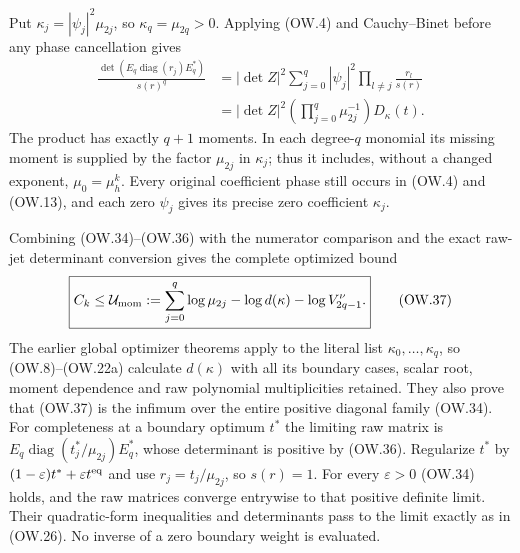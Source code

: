 \documentclass[11pt]{article}
\newcommand{\diag}{\operatorname{diag}}
\begin{document}
Put $\kappa_j=|\psi_j|^2\mu_{2j}$, so $\kappa_q=\mu_{2q}>0$.
Applying (OW.4) and Cauchy--Binet before any phase cancellation gives
\[
 \begin{split}
 \frac{\det(E_q\diag(r_j)E_q^*)}{s(r)^q}
 &=|\det Z|^2\sum_{j=0}^q|\psi_j|^2
                 \prod_{l\ne j}\frac{r_l}{s(r)}\\
 &=|\det Z|^2\left(\prod_{j=0}^q\mu_{2j}^{-1}\right)
            D_\kappa(t).
 \end{split}                                                  \tag{OW.36}
\]
The product has exactly $q+1$ moments. In each degree-$q$ monomial
its missing moment is supplied by the factor $\mu_{2j}$ in $\kappa_j$;
thus it includes, without a changed exponent, $\mu_0=\mu_h^k$.
Every original coefficient phase still occurs in (OW.4) and (OW.13),
and each zero $\psi_j$ gives its precise zero coefficient $\kappa_j$.

Combining (OW.34)--(OW.36) with the numerator comparison and the exact
raw-jet determinant conversion gives the complete optimized bound
\[
 \boxed{C_k\le\mathcal U_{\rm mom}:=
   \sum_{j=0}^q\log\mu_{2j}-\log d(\kappa)-\log V_{2q-1}^\nu.}
 \tag{OW.37}
\]
The earlier global optimizer theorems apply to the literal list
$\kappa_0,\ldots,\kappa_q$, so (OW.8)--(OW.22a) calculate $d(\kappa)$
with all its boundary cases, scalar root, moment dependence and raw
polynomial multiplicities retained. They also prove that (OW.37) is
the infimum over the entire positive diagonal family (OW.34).
For completeness at a boundary optimum $t^*$ the limiting raw matrix is
$E_q\diag(t_j^*/\mu_{2j})E_q^*$, whose determinant is positive by
(OW.36). Regularize $t^*$ by $(1-\varepsilon)t^*+
\varepsilon t^{\rm eq}$ and use $r_j=t_j/\mu_{2j}$, so $s(r)=1$.
For every $\varepsilon>0$ (OW.34) holds, and the raw matrices converge
entrywise to that positive definite limit. Their quadratic-form
inequalities and determinants pass to the limit exactly as in (OW.26).
No inverse of a zero boundary weight is evaluated.
\end{document}
